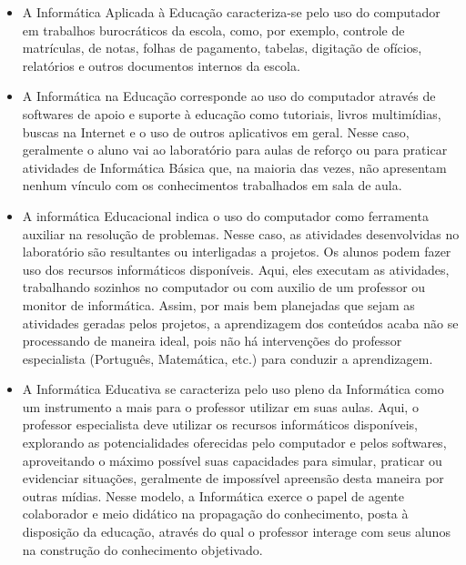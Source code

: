 \begin{itemize}

    \item A Informática Aplicada à Educação caracteriza-se pelo uso do
    computador em trabalhos burocráticos da escola, como, por exemplo,
    controle de matrículas, de notas, folhas de pagamento, tabelas,
    digitação de ofícios, relatórios e outros documentos internos da escola.

    \item A Informática na Educação corresponde ao uso do computador através
    de softwares de apoio e suporte à educação como tutoriais, livros
    multimídias, buscas na Internet e o uso de outros aplicativos em geral.
    Nesse caso, geralmente o aluno vai ao laboratório para aulas de reforço
    ou para praticar atividades de Informática Básica que, na maioria das
    vezes, não apresentam nenhum vínculo com os conhecimentos trabalhados em
    sala de aula.

    \item A informática Educacional indica o uso do computador como
    ferramenta auxiliar na resolução de problemas. Nesse caso, as atividades
    desenvolvidas no laboratório são resultantes ou interligadas a projetos.
    Os alunos podem fazer uso dos recursos informáticos disponíveis. Aqui,
    eles executam as atividades, trabalhando sozinhos no computador ou com
    auxilio de um professor ou monitor de informática. Assim, por mais bem
    planejadas que sejam as atividades geradas pelos projetos, a
    aprendizagem dos conteúdos acaba não se processando de maneira ideal,
    pois não há intervenções do professor especialista (Português,
    Matemática, etc.) para conduzir a aprendizagem.

    \item A Informática Educativa se caracteriza pelo uso pleno da
    Informática como um instrumento a mais para o professor utilizar em suas
    aulas. Aqui, o professor especialista deve utilizar os recursos
    informáticos disponíveis, explorando as potencialidades oferecidas pelo
    computador e pelos softwares, aproveitando o máximo possível suas
    capacidades para simular, praticar ou evidenciar situações, geralmente
    de impossível apreensão desta maneira por outras mídias. Nesse modelo, a
    Informática exerce o papel de agente colaborador e meio didático na
    propagação do conhecimento, posta à disposição da educação, através do
    qual o professor interage com seus alunos na construção do conhecimento
    objetivado.

\end{itemize}

